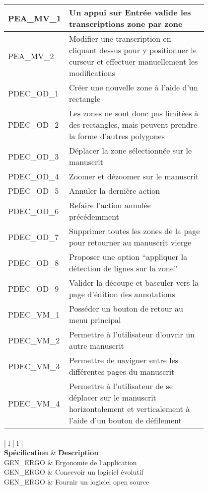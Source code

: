 \begin{center}
\begin{tabular}{ | l | p{0.8\linewidth} | }
	\hline
	PEA\_MV\_1 & Un appui sur Entrée valide les transcriptions zone par zone \\
	\hline
	PEA\_MV\_2 & Modifier une transcription en cliquant dessus pour y positionner le curseur et effectuer manuellement les modifications  \\
	\hline
	PDEC\_OD\_1 & Créer une nouvelle zone à l’aide d’un rectangle \\
	\hline
	PDEC\_OD\_2 & Les zones ne sont donc pas limitées à des rectangles, mais peuvent prendre la forme d’autres polygones \\
	\hline
	PDEC\_OD\_3 & Déplacer la zone sélectionnée sur le manuscrit \\
	\hline
	PDEC\_OD\_4 & Zoomer et dézoomer sur le manuscrit  \\
	\hline
	PDEC\_OD\_5 & Annuler la dernière action \\
	\hline
	PDEC\_OD\_6 & Refaire l’action annulée précédemment \\
	\hline
	PDEC\_OD\_7 & Supprimer toutes les zones de la page pour retourner au manuscrit vierge \\
	\hline
	PDEC\_OD\_8 & Proposer une option “appliquer la détection de lignes sur la zone” \\
	\hline
	PDEC\_OD\_9 & Valider la découpe et basculer vers la page d’édition des annotations  \\
	\hline
	PDEC\_VM\_1 & Posséder un bouton de retour au menu principal \\
	\hline
	PDEC\_VM\_2 & Permettre à l’utilisateur d’ouvrir un autre manuscrit \\
	\hline
	PDEC\_VM\_3 & Permettre de naviguer entre les différentes pages du manuscrit \\
	\hline
	PDEC\_VM\_4 & Permettre à l’utilisateur de se déplacer sur le manuscrit horizontalement et verticalement à l’aide d’un bouton de défilement \\
	\hline
\end{tabular}

\paragraph{}
\begin{tabular}{ | l | l | }
	\hline
	 \\
	\hline
	\textbf{Spécification} & \textbf{Description} \\
	\hline
	GEN\_ERGO & Ergonomie de l‘application \\
	\hline
	GEN\_ERGO & Concevoir un logiciel évolutif \\
	\hline
	GEN\_ERGO & Fournir un logiciel open source \\
	\hline
\end{tabular}

\end{center}


